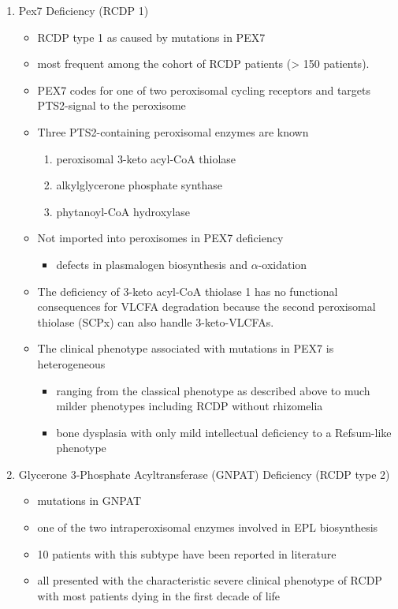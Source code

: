 \documentclass{scrartcl}
\begin{document}
\begin{enumerate}
\item Pex7 Deficiency (RCDP 1)
\label{sec:org0ecf1b0}

\begin{itemize}
\item RCDP type 1 as caused by mutations in PEX7
\item most frequent among the cohort of RCDP patients (> 150 patients).
\item PEX7 codes for one of two peroxisomal cycling receptors and targets PTS2-signal to the peroxisome
\item Three PTS2-containing peroxisomal enzymes are known 
\begin{enumerate}
\item peroxisomal 3-keto acyl-CoA thiolase
\item alkylglycerone phosphate synthase
\item phytanoyl-CoA hydroxylase
\end{enumerate}
\item Not imported into peroxisomes in PEX7 deficiency
\begin{itemize}
\item defects in plasmalogen biosynthesis and \(\alpha\)-oxidation
\end{itemize}
\item The deficiency of 3-keto acyl-CoA thiolase 1 has no functional
consequences for VLCFA degradation because the second peroxisomal
thiolase (SCPx) can also handle 3-keto-VLCFAs.

\item The clinical phenotype associated with mutations in PEX7 is heterogeneous
\begin{itemize}
\item ranging from the classical phenotype as described above to much milder phenotypes including RCDP without rhizomelia
\item bone dysplasia with only mild intellectual deficiency to a Refsum-like phenotype
\end{itemize}
\end{itemize}

\item Glycerone 3-Phosphate Acyltransferase (GNPAT) Deficiency (RCDP type 2)
\label{sec:orgc60b5cd}
\begin{itemize}
\item mutations in GNPAT
\item one of the two intraperoxisomal enzymes involved in EPL biosynthesis
\item 10 patients with this subtype have been reported in literature
\item all presented with the characteristic severe clinical phenotype of
RCDP with most patients dying in the first decade of life
\end{itemize}


\end{enumerate}
\end{document}
